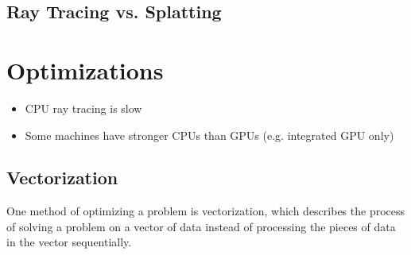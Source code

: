 \documentclass[a4paper, 11pt]{memoir}
\begin{document}
    \section{Ray Tracing vs. Splatting}

    \chapter{Optimizations}
    \label{ch:optimizations}
    \begin{itemize}
        \item CPU ray tracing is slow
        \item Some machines have stronger CPUs than GPUs (e.g. integrated GPU only)
    \end{itemize}

    \section{Vectorization}
    \label{sec:vectorization}
    One method of optimizing a problem is vectorization, which describes the process of
    solving a problem on a vector of data instead of processing the pieces of data in the
    vector sequentially.
\end{document}
